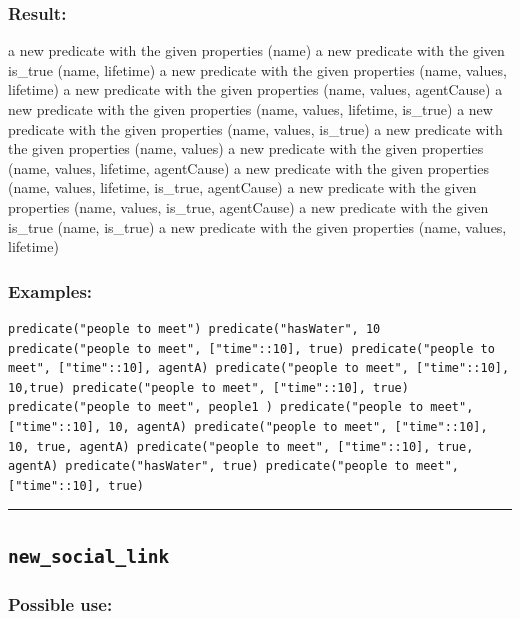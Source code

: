 \documentclass[]{book}
\theoremstyle{definition}
\theoremstyle{definition}
\theoremstyle{definition}
\theoremstyle{remark}
\begin{document}
\subsubsection{Result:}\label{result-359}

a new predicate with the given properties (name) a new predicate with
the given is\_true (name, lifetime) a new predicate with the given
properties (name, values, lifetime) a new predicate with the given
properties (name, values, agentCause) a new predicate with the given
properties (name, values, lifetime, is\_true) a new predicate with the
given properties (name, values, is\_true) a new predicate with the given
properties (name, values) a new predicate with the given properties
(name, values, lifetime, agentCause) a new predicate with the given
properties (name, values, lifetime, is\_true, agentCause) a new
predicate with the given properties (name, values, is\_true, agentCause)
a new predicate with the given is\_true (name, is\_true) a new predicate
with the given properties (name, values, lifetime)

\subsubsection{Examples:}\label{examples-258}

\begin{verbatim}
predicate("people to meet") predicate("hasWater", 10  predicate("people to meet", ["time"::10], true) predicate("people to meet", ["time"::10], agentA) predicate("people to meet", ["time"::10], 10,true) predicate("people to meet", ["time"::10], true) predicate("people to meet", people1 ) predicate("people to meet", ["time"::10], 10, agentA) predicate("people to meet", ["time"::10], 10, true, agentA) predicate("people to meet", ["time"::10], true, agentA) predicate("hasWater", true) predicate("people to meet", ["time"::10], true) 
\end{verbatim}

\begin{center}\rule{0.5\linewidth}{\linethickness}\end{center}

\subsection{\texorpdfstring{\texttt{new\_social\_link}}{new\_social\_link}}\label{new_social_link}

\subsubsection{Possible use:}\label{possible-use-372}
\end{document}
